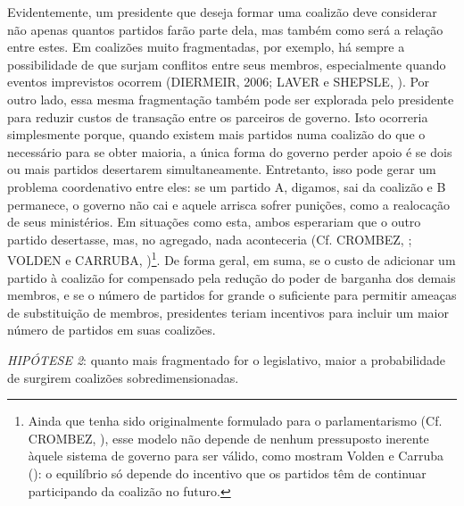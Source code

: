 Evidentemente, um presidente que deseja formar uma coalizão deve considerar não apenas quantos partidos farão parte dela, mas também como será a relação entre estes. Em coalizões muito fragmentadas, por exemplo, há sempre a possibilidade de que surjam conflitos entre seus membros, especialmente quando eventos imprevistos ocorrem (DIERMEIR, 2006; LAVER e SHEPSLE, \citeyear{laver1996}). Por outro lado, essa mesma fragmentação também pode ser explorada pelo presidente para reduzir custos de transação entre os parceiros de governo. Isto ocorreria simplesmente porque, quando existem mais partidos numa coalizão do que o necessário para se obter maioria, a única forma do governo perder apoio é se dois ou mais partidos desertarem simultaneamente. Entretanto, isso pode gerar um problema coordenativo entre eles: se um partido A, digamos, sai da coalizão e B permanece, o governo não cai e aquele arrisca sofrer punições, como a realocação de seus ministérios. Em situações como esta, ambos esperariam que o outro partido desertasse, mas, no agregado, nada aconteceria (Cf. CROMBEZ, \citeyear{crombez1996}; VOLDEN e CARRUBA, \citeyear{volden2004})\footnote{Ainda que tenha sido originalmente formulado para o parlamentarismo (Cf. CROMBEZ, \citeyear{crombez1996}), esse modelo não depende de nenhum pressuposto inerente àquele sistema de governo para ser válido, como mostram Volden e Carruba (\citeyear{volden2004}): o equilíbrio só depende do incentivo que os partidos têm de continuar participando da coalizão no futuro.}. De forma geral, em suma, se o custo de adicionar um partido à coalizão for compensado pela redução do poder de barganha dos demais membros, e se o número de partidos for grande o suficiente para permitir ameaças de substituição de membros, presidentes teriam incentivos para incluir um maior número de partidos em suas coalizões.

\vspace*{1\baselineskip}\vspace*{-\parskip}
\noindent
\textit{HIPÓTESE 2}: quanto mais fragmentado for o legislativo, maior a probabilidade de surgirem coalizões sobredimensionadas.
\vspace*{1\baselineskip}


